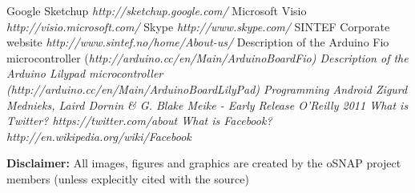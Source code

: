 \begin{thebibliography}{99}
 Google Sketchup {\em http://sketchup.google.com/}
 Microsoft Visio {\em http://visio.microsoft.com/}
 Skype {\em http://www.skype.com/}
 SINTEF Corporate website {\em http://www.sintef.no/home/About-us/}
 Description of the Arduino Fio microcontroller (\em http://arduino.cc/en/Main/ArduinoBoardFio)
  Description of the Arduino Lilypad microcontroller (\em http://arduino.cc/en/Main/ArduinoBoardLilyPad)
 Programming Android {\em Zigurd Mednieks, Laird Dornin \& G. Blake Meike - Early Release O'Reilly 2011}
 What is Twitter? {\em https://twitter.com/about}
 What is Facebook? {\em http://en.wikipedia.org/wiki/Facebook}
\end{thebibliography}


\textbf{Disclaimer:}
All images, figures and graphics are created by the oSNAP project members (unless explecitly cited with the source)
